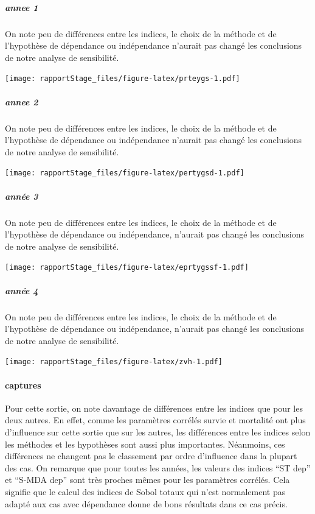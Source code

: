 \documentclass[
]{article}
\begin{document}
\hypertarget{annee-1-1}{%
\subparagraph{annee 1}\label{annee-1-1}}

On note peu de différences entre les indices, le choix de la méthode et
de l'hypothèse de dépendance ou indépendance n'aurait pas changé les
conclusions de notre analyse de sensibilité.

\texttt{[image: rapportStage\_files/figure-latex/prteygs-1.pdf]}

\hypertarget{annee-2-1}{%
\subparagraph{annee 2}\label{annee-2-1}}

On note peu de différences entre les indices, le choix de la méthode et
de l'hypothèse de dépendance ou indépendance n'aurait pas changé les
conclusions de notre analyse de sensibilité.

\texttt{[image: rapportStage\_files/figure-latex/pertygsd-1.pdf]}

\hypertarget{annuxe9e-3-1}{%
\subparagraph{année 3}\label{annuxe9e-3-1}}

On note peu de différences entre les indices, le choix de la méthode et
de l'hypothèse de dépendance ou indépendance, n'aurait pas changé les
conclusions de notre analyse de sensibilité.

\texttt{[image: rapportStage\_files/figure-latex/eprtygssf-1.pdf]}

\hypertarget{annuxe9e-4-1}{%
\subparagraph{année 4}\label{annuxe9e-4-1}}

On note peu de différences entre les indices, le choix de la méthode et
de l'hypothèse de dépendance ou indépendance, n'aurait pas changé les
conclusions de notre analyse de sensibilité.

\texttt{[image: rapportStage\_files/figure-latex/zvh-1.pdf]}

\hypertarget{captures}{%
\paragraph{captures}\label{captures}}

Pour cette sortie, on note davantage de différences entre les indices
que pour les deux autres. En effet, comme les paramètres corrélés survie
et mortalité ont plus d'influence sur cette sortie que sur les autres,
les différences entre les indices selon les méthodes et les hypothèses
sont aussi plus importantes. Néanmoins, ces différences ne changent pas
le classement par ordre d'influence dans la plupart des cas. On remarque
que pour toutes les années, les valeurs des indices ``ST dep'' et
``S-MDA dep'' sont très proches mêmes pour les paramètres corrélés. Cela
signifie que le calcul des indices de Sobol totaux qui n'est normalement
pas adapté aux cas avec dépendance donne de bons résultats dans ce cas
précis.
\end{document}
